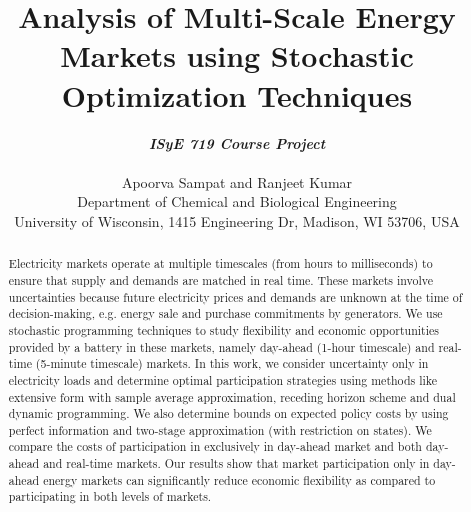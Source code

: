 \documentclass[11pt,twoside]{article}
\begin{document}
\title{Analysis of Multi-Scale Energy Markets using Stochastic Optimization Techniques}

\author{\textbf{\textit{ISyE 719 Course Project}}\\ \\Apoorva Sampat and Ranjeet Kumar\\
 {\small Department of Chemical and Biological Engineering}\\
 {\small \;University of Wisconsin, 1415 Engineering Dr, Madison, WI 53706, USA}}
\date{}
\maketitle

\begin{abstract}
Electricity markets operate at multiple timescales (from hours to milliseconds) to ensure that supply and demands are matched in real time. These markets involve uncertainties because future electricity prices and demands are unknown at the time of decision-making, e.g. energy sale and purchase commitments by generators. We use stochastic programming techniques to study flexibility and economic opportunities provided by a battery in these markets, namely day-ahead (1-hour timescale) and real-time (5-minute timescale) markets. In this work, we consider uncertainty only in electricity loads and determine optimal participation strategies using methods like extensive form with sample average approximation, receding horizon scheme and dual dynamic programming. We also determine bounds on expected policy costs by using perfect information and two-stage approximation (with restriction on states). We compare the costs of participation in exclusively in day-ahead market and both day-ahead and real-time markets. Our results show that market participation only in day-ahead energy markets can significantly reduce economic flexibility as compared to participating in both levels of markets.
\end{abstract}
\end{document}
